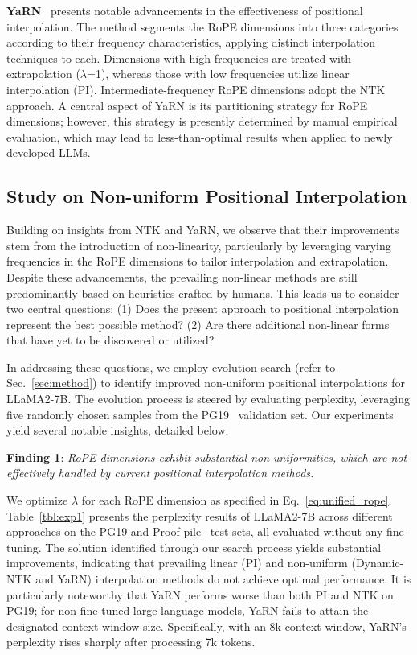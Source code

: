 \textbf{YaRN}~\cite{yarn} presents notable advancements in the effectiveness of positional interpolation. The method segments the RoPE dimensions into three categories according to their frequency characteristics, applying distinct interpolation techniques to each. Dimensions with high frequencies are treated with extrapolation ($\lambda$=1), whereas those with low frequencies utilize linear interpolation (PI). Intermediate-frequency RoPE dimensions adopt the NTK approach. A central aspect of YaRN is its partitioning strategy for RoPE dimensions; however, this strategy is presently determined by manual empirical evaluation, which may lead to less-than-optimal results when applied to newly developed LLMs.

\subsection{Study on Non-uniform Positional Interpolation}

Building on insights from NTK and YaRN, we observe that their improvements stem from the introduction of non-linearity, particularly by leveraging varying frequencies in the RoPE dimensions to tailor interpolation and extrapolation. Despite these advancements, the prevailing non-linear methods are still predominantly based on heuristics crafted by humans. This leads us to consider two central questions: (1) Does the present approach to positional interpolation represent the best possible method? (2) Are there additional non-linear forms that have yet to be discovered or utilized?

In addressing these questions, we employ evolution search (refer to Sec.~\ref{sec:method}) to identify improved non-uniform positional interpolations for LLaMA2-7B. The evolution process is steered by evaluating perplexity, leveraging five randomly chosen samples from the PG19~\cite{pg19} validation set. Our experiments yield several notable insights, detailed below.

\textbf{Finding 1}: \textit{RoPE dimensions exhibit substantial non-uniformities, which are not effectively handled by current positional interpolation methods.}

We optimize $\lambda$ for each RoPE dimension as specified in Eq.~\ref{eq:unified_rope}. Table~\ref{tbl:exp1} presents the perplexity results of LLaMA2-7B across different approaches on the PG19 and Proof-pile~\cite{proof-pile} test sets, all evaluated without any fine-tuning. The solution identified through our search process yields substantial improvements, indicating that prevailing linear (PI) and non-uniform (Dynamic-NTK and YaRN) interpolation methods do not achieve optimal performance. It is particularly noteworthy that YaRN performs worse than both PI and NTK on PG19; for non-fine-tuned large language models, YaRN fails to attain the designated context window size. Specifically, with an 8k context window, YaRN's perplexity rises sharply after processing 7k tokens.

